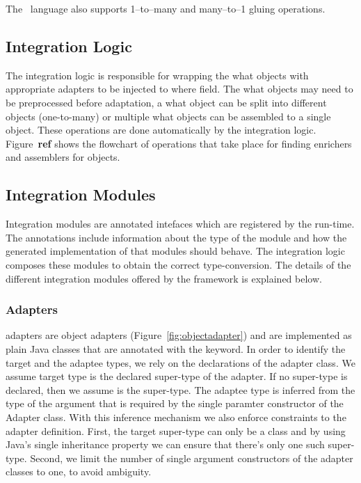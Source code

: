 The \gluer~language also supports 1--to--many and many--to--1 gluing operations. 




\subsection{Integration Logic}
\label{sec:zamk:logic}
The integration logic is responsible for wrapping the what objects with appropriate adapters to be injected to where field. 
The what objects may need to be preprocessed before adaptation, a what object can be split into different objects (one-to-many) or multiple what objects can be assembled to a single object. 
These operations are done automatically by the integration logic. Figure~\textbf{ref} shows the flowchart of operations that take place for finding enrichers and assemblers for objects.


\subsection{Integration Modules}
\label{sec:zamk:modules}
Integration modules are annotated intefaces which are registered by the \zamk run-time. The annotations include information about the type of the module and how the generated implementation of that modules should behave. The integration logic composes these modules to obtain the correct type-conversion. The details of the different integration modules offered by the \zamk framework is explained below.


\subsubsection{Adapters}
\zamk adapters are object adapters (Figure~\ref{fig:objectadapter}) and are implemented as plain Java classes that are annotated with the  keyword. 
In order to identify the target and the adaptee types, we rely on the declarations of the adapter class.
We assume target type is the declared super-type of the adapter. 
If no super-type is declared, then we assume  is the super-type.
The adaptee type is inferred from the type of the argument that is required by the single paramter constructor of the Adapter class. 
With this inference mechanism we also enforce constraints to the adapter definition.
First, the target super-type can only be a class and by using Java's single inheritance property we can ensure that there's only one such super-type. 
Second, we limit the number of single argument constructors of the adapter classes to one, to avoid ambiguity.

